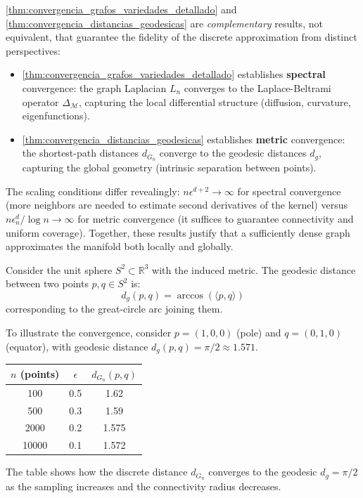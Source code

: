 \begin{remark}\label{rem:complementariedad_convergencias}
\autoref{thm:convergencia_grafos_variedades_detallado} and \autoref{thm:convergencia_distancias_geodesicas} are \emph{complementary} results, not equivalent, that guarantee the fidelity of the discrete approximation from distinct perspectives:
\begin{itemize}
	\item \autoref{thm:convergencia_grafos_variedades_detallado} establishes \textbf{spectral} convergence: the graph Laplacian $L_n$ converges to the Laplace-Beltrami operator $\Delta_\mathcal{M}$, capturing the local differential structure (diffusion, curvature, eigenfunctions).
	\item \autoref{thm:convergencia_distancias_geodesicas} establishes \textbf{metric} convergence: the shortest-path distances $d_{G_n}$ converge to the geodesic distances $d_g$, capturing the global geometry (intrinsic separation between points).
\end{itemize}
The scaling conditions differ revealingly: $n\epsilon^{d+2} \to \infty$ for spectral convergence (more neighbors are needed to estimate second derivatives of the kernel) versus $n\epsilon_n^d / \log n \to \infty$ for metric convergence (it suffices to guarantee connectivity and uniform coverage). Together, these results justify that a sufficiently dense graph approximates the manifold both locally and globally.
\end{remark}

\begin{example}\label{ex:geodesicas_discretas_esfera}
	Consider the unit sphere $S^2 \subset \mathbb{R}^3$ with the induced metric. The geodesic distance between two points $p, q \in S^2$ is:
	\[
		d_g(p, q) = \arccos(\langle p, q \rangle)
	\]
	corresponding to the great-circle arc joining them.

	To illustrate the convergence, consider $p = (1, 0, 0)$ (pole) and $q = (0, 1, 0)$ (equator), with geodesic distance $d_g(p, q) = \pi/2 \approx 1.571$.

	\begin{center}
	\begin{tabular}{ccc}
		\toprule
		$n$ (points) & $\epsilon$ & $d_{G_n}(p, q)$ \\
		\midrule
		100 & 0.5 & 1.62 \\
		500 & 0.3 & 1.59 \\
		2000 & 0.2 & 1.575 \\
		10000 & 0.1 & 1.572 \\
		\bottomrule
	\end{tabular}
	\end{center}

	The table shows how the discrete distance $d_{G_n}$ converges to the geodesic $d_g = \pi/2$ as the sampling increases and the connectivity radius decreases.
\end{example}

